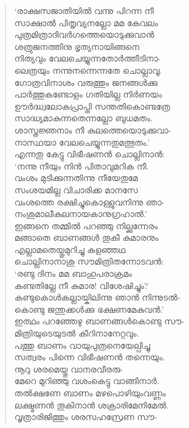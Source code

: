 \begin{verse}
‘രാക്ഷസജാതിയില്‍ വന്നു പിറന്ന നീ\\
സാക്ഷാല്‍ പിതൃവ്യനല്ലോ മമ കേവലം\\
പുത്രമിത്രാദിവര്‍ഗത്തെയൊടുക്കുവാന്‍\\
ശത്രുജനത്തിനു ഭൃത്യനായിങ്ങനെ\\
നിത്യവും വേലചെയ്യുന്നതോര്‍ത്തീടിനാ-\\
ലെത്രയും നന്നുനന്നെന്നതേ ചൊല്ലാവൂ.\\
ഗോത്രവിനാശം വരുത്തും ജനങ്ങള്‍ക്കു\\
പാര്‍ത്തുകണ്ടോളം ഗതിയില്ല നിര്‍ണയം\\
ഊര്‍ദ്ധ്വലോകപ്രാപ്തി സന്തതികൊണ്ടത്രേ\\
സാദ്ധ്യമാകുന്നതെന്നല്ലോ ബുധമതം.\\
ശാസ്ത്രജ്ഞനാം നീ കുലത്തെയൊടുക്കുവാ-\\
നാസ്ഥയാ വേലചെയ്യുന്നതുമത്ഭുതം.’\\
എന്നതു കേട്ടു വിഭീഷണന്‍ ചൊല്ലിനാന്‍:\\
‘നന്നു നീയും നിന്‍ പിതാവുമറിക നീ.\\
വംശം മുടിക്കുന്നതിന്നു നീയേതുമേ\\
സംശയമില്ല വിചാരിക്ക മാനസേ\\
വംശത്തെ രക്ഷിച്ചുകൊള്ളുവനിന്നു ഞാ-\\
നംശുമാലീകുലനായകാനുഗ്രഹാല്‍.’\\
ഇങ്ങനെ തമ്മില്‍ പറഞ്ഞു നില്ക്കുന്നേരം\\
മങ്ങാതെ ബാണങ്ങള്‍ തൂകീ കുമാരനും\\
എല്ലാമതെയ്തുമുറിച്ചു കളഞ്ഞഥ\\
ചൊല്ലിനാനാശു സൗമിത്രിതന്നോടവന്‍:\\
‘രണ്ടു ദിനം മമ ബാഹുപരാക്രമം\\
കണ്ടതില്ലേ നീ കുമാര! വിശേഷിച്ചും?\\
കണ്ടുകൊള്‍കല്ലായ്കിലിന്നു ഞാന്‍ നിന്നുടല്‍-\\
കൊണ്ടു ജന്തുക്കള്‍ക്കു ഭക്ഷണമേകുവന്‍.’\\
ഇത്ഥം പറഞ്ഞേഴു ബാണങ്ങള്‍കൊണ്ടു സൗ-\\
മിത്രിയുടെയുടല്‍ കീറിനാനേറ്റവും.\\
പത്തു ബാണം വായുപുത്രനെയേല്പിച്ചു\\
സത്വരം പിന്നെ വിഭീഷണന്‍ തന്നെയും.\\
നൂറു ശരമെയ്തു വാനരവീരരു-\\
മേറെ മുറിഞ്ഞു വശംകെട്ടു വാങ്ങിനാര്‍.\\
തല്‍ക്ഷണേ ബാണം മഴപൊഴിയുംവണ്ണം\\
ലക്ഷ്മണന്‍ തൂകിനാന്‍ ശക്രാരിമേനിമേല്‍.\\
വൃത്രാരിജിത്തും ശരസഹസ്രേണ സൗ-\\

\end{verse}
